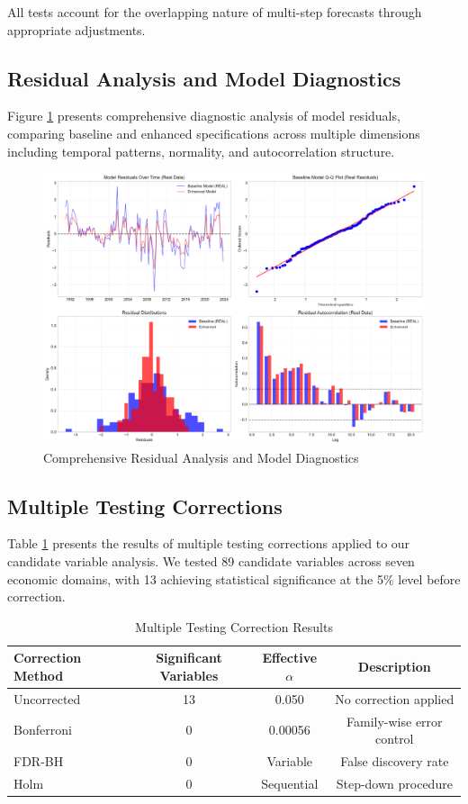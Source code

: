 \documentclass[12pt]{article}
\begin{document}
All tests account for the overlapping nature of multi-step forecasts through appropriate adjustments.

\subsection{Residual Analysis and Model Diagnostics}

Figure \ref{fig:residual_analysis} presents comprehensive diagnostic analysis of model residuals, comparing baseline and enhanced specifications across multiple dimensions including temporal patterns, normality, and autocorrelation structure.

\begin{figure}[H]
\centering
\includegraphics[width=\textwidth]{figures/residual_analysis.pdf}
\caption{Comprehensive Residual Analysis and Model Diagnostics}
\label{fig:residual_analysis}
\end{figure}

\subsection{Multiple Testing Corrections}

Table \ref{tab:multiple} presents the results of multiple testing corrections applied to our candidate variable analysis. We tested 89 candidate variables across seven economic domains, with 13 achieving statistical significance at the 5\% level before correction.

\begin{table}[H]
\centering
\caption{Multiple Testing Correction Results}
\label{tab:multiple}
\begin{tabular}{lccc}
\toprule
Correction Method & Significant Variables & Effective $\alpha$ & Description \\
\midrule
Uncorrected & 13 & 0.050 & No correction applied \\
Bonferroni & 0 & 0.00056 & Family-wise error control \\
FDR-BH & 0 & Variable & False discovery rate \\
Holm & 0 & Sequential & Step-down procedure \\
\bottomrule
\end{tabular}
\end{table}
\end{document}
